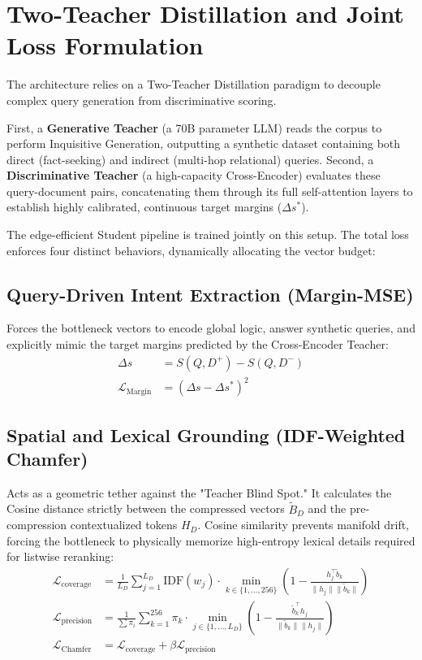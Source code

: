 \documentclass[11pt, a4paper]{article}
\begin{document}
\section{Two-Teacher Distillation and Joint Loss Formulation}
The architecture relies on a Two-Teacher Distillation paradigm to decouple complex query generation from discriminative scoring. 

First, a \textbf{Generative Teacher} (a 70B parameter LLM) reads the corpus to perform Inquisitive Generation, outputting a synthetic dataset containing both direct (fact-seeking) and indirect (multi-hop relational) queries. Second, a \textbf{Discriminative Teacher} (a high-capacity Cross-Encoder) evaluates these query-document pairs, concatenating them through its full self-attention layers to establish highly calibrated, continuous target margins ($\Delta s^*$). 

The edge-efficient Student pipeline is trained jointly on this setup. The total loss enforces four distinct behaviors, dynamically allocating the vector budget:

\subsection{Query-Driven Intent Extraction (Margin-MSE)}
Forces the bottleneck vectors to encode global logic, answer synthetic queries, and explicitly mimic the target margins predicted by the Cross-Encoder Teacher:
\begin{align}
    \Delta s &= S(Q, D^+) - S(Q, D^-) \\
    \mathcal{L}_{\text{Margin}} &= (\Delta s - \Delta s^*)^2
\end{align}

\subsection{Spatial and Lexical Grounding (IDF-Weighted Chamfer)}
Acts as a geometric tether against the "Teacher Blind Spot." It calculates the Cosine distance strictly between the compressed vectors $\tilde{B}_D$ and the pre-compression contextualized tokens $H_D$. Cosine similarity prevents manifold drift, forcing the bottleneck to physically memorize high-entropy lexical details required for listwise reranking:
\begin{align}
    \mathcal{L}_{\text{coverage}} &= \frac{1}{L_D} \sum_{j=1}^{L_D} \text{IDF}(w_j) \cdot \min_{k \in \{1, \dots, 256\}} \left( 1 - \frac{h_j^\top \tilde{b}_k}{\|h_j\| \|\tilde{b}_k\|} \right) \\
    \mathcal{L}_{\text{precision}} &= \frac{1}{\sum \pi_i} \sum_{k=1}^{256} \pi_k \cdot \min_{j \in \{1, \dots, L_D\}} \left( 1 - \frac{\tilde{b}_k^\top h_j}{\|\tilde{b}_k\| \|h_j\|} \right) \\
    \mathcal{L}_{\text{Chamfer}} &= \mathcal{L}_{\text{coverage}} + \beta \mathcal{L}_{\text{precision}}
\end{align}
\end{document}
